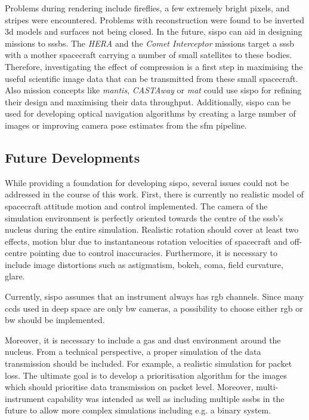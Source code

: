 Problems during rendering include fireflies, a few extremely bright pixels, and stripes were encountered.
Problems with reconstruction were found to be inverted \gls{3d} models and surfaces not being closed.
In the future, \gls{sispo} can aid in designing missions to \glspl{sssb}. The \textit{HERA} and the \textit{Comet Interceptor} missions target a \gls{sssb} with a mother spacecraft carrying a number of small satellites to these bodies. Therefore, investigating the effect of compression is a first step in maximising the useful scientific image data that can be transmitted from these small spacecraft. Also mission concepts like \textit{\gls{mantis}}, \textit{CASTAway} or \textit{\gls{mat}} could use \gls{sispo} for refining their design and maximising their data throughput. Additionally, \gls{sispo} can be used for developing optical navigation algorithms by creating a large number of images or improving camera pose estimates from the \gls{sfm} pipeline.

\subsection{Future Developments}
While providing a foundation for developing \gls{sispo}, several issues could not be addressed in the course of this work.
First, there is currently no realistic model of spacecraft attitude motion and control implemented. The camera of the simulation environment is perfectly oriented towards the centre of the \gls{sssb}'s nucleus during the entire simulation. Realistic rotation should cover at least two effects, motion blur due to instantaneous rotation velocities of spacecraft and off-centre pointing due to control inaccuracies. Furthermore, it is necessary to include  image distortions such as astigmatism, bokeh, coma, field curvature, glare.

Currently, \gls{sispo} assumes that an instrument always has \gls{rgb} channels. Since many \gls{ccd}s used in deep space are only \gls{bw} cameras, a possibility to choose either \gls{rgb} or \gls{bw} should be implemented.

Moreover, it is necessary to include a gas and dust environment around the nucleus. From a technical perspective, a proper simulation of the data transmission should be included. For example, a realistic simulation for packet loss. The ultimate goal is to develop a prioritisation algorithm for the images which should prioritise data transmission on packet level.
Moreover, multi-instrument capability was intended as well as including multiple \gls{sssb}s in the future to allow more complex simulations including e.g. a binary system.

